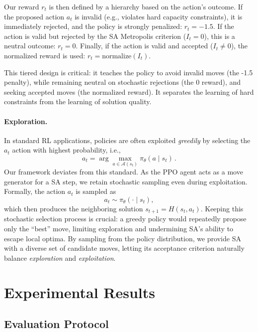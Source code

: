 \documentclass[letterpaper]{article} %
\begin{document}
Our reward $r_t$ is then defined by a hierarchy based on the action's outcome. If the proposed action $a_t$ is invalid (e.g., violates hard capacity constraints), it is immediately rejected, and the policy is strongly penalized: $r_t = -1.5$. If the action is valid but rejected by the SA Metropolis criterion ($I_t = 0$), this is a neutral outcome: $r_t = 0$. Finally, if the action is valid and accepted ($I_t \neq 0$), the normalized reward is used: $r_t = \text{normalize}(I_t)$. 

This tiered design is critical: it teaches the policy to avoid invalid moves (the -1.5 penalty), while remaining neutral on stochastic rejections (the 0 reward), and seeking accepted moves (the normalized reward). It separates the learning of hard constraints from the learning of solution quality.



\paragraph{Exploration.}

In standard RL applications, policies are often exploited \textit{greedily} by selecting the $a_t$ action with highest probability, i.e.,
$$
a_t = \arg \max_{a \in \mathcal{A}(s_t)} \pi_{\theta}(a \mid s_t) \,.
$$
Our framework deviates from this standard. As the PPO agent acts as a move generator for a SA step, we retain stochastic sampling even during exploitation. Formally, the action $a_t$ is sampled as
\begin{equation*}
a_t \sim \pi_{\theta}(\cdot \mid s_t),
\end{equation*}
which then produces the neighboring solution $s_{t+1} = H(s_t, a_t)$. 
Keeping this stochastic selection process is crucial: a greedy policy would repeatedly propose only the ``best'' move, limiting exploration and undermining SA's ability to escape local optima. By sampling from the policy distribution, we provide SA with a diverse set of candidate moves, letting its acceptance criterion naturally balance \textit{exploration} and \textit{exploitation}.



\section{Experimental Results}

\subsection{Evaluation Protocol}
\end{document}
